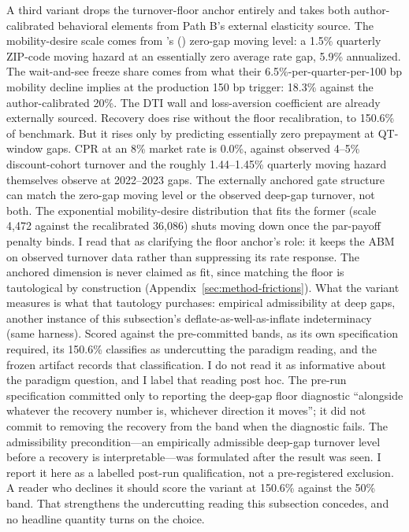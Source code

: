 \documentclass[12pt]{article}
\newcommand{\citepos}[1]{\citeauthor{#1}'s (\citeyear{#1})}
\begin{document}
A third variant drops the turnover-floor anchor entirely and takes both author-calibrated behavioral elements from Path B's external elasticity source. The mobility-desire scale comes from \citepos{liebersohn2024} zero-gap moving level: a 1.5\% quarterly ZIP-code moving hazard at an essentially zero average rate gap, 5.9\% annualized. The wait-and-see freeze share comes from what their 6.5\%-per-quarter-per-100 bp mobility decline implies at the production 150 bp trigger: 18.3\% against the author-calibrated 20\%. The DTI wall and loss-aversion coefficient are already externally sourced. Recovery does rise without the floor recalibration, to 150.6\% of benchmark. But it rises only by predicting essentially zero prepayment at QT-window gaps. CPR at an 8\% market rate is 0.0\%, against observed 4--5\% discount-cohort turnover and the roughly 1.44--1.45\% quarterly moving hazard \citet{liebersohn2024} themselves observe at 2022--2023 gaps. The externally anchored gate structure can match the zero-gap moving level or the observed deep-gap turnover, not both. The exponential mobility-desire distribution that fits the former (scale 4{,}472 against the recalibrated 36{,}086) shuts moving down once the par-payoff penalty binds. I read that as clarifying the floor anchor's role: it keeps the ABM on observed turnover data rather than suppressing its rate response. The anchored dimension is never claimed as fit, since matching the floor is tautological by construction (Appendix~\ref{sec:method-frictions}). What the variant measures is what that tautology purchases: empirical admissibility at deep gaps, another instance of this subsection's deflate-as-well-as-inflate indeterminacy (same harness). Scored against the pre-committed bands, as its own specification required, its 150.6\% classifies as undercutting the paradigm reading, and the frozen artifact records that classification. I do not read it as informative about the paradigm question, and I label that reading post hoc. The pre-run specification committed only to reporting the deep-gap floor diagnostic ``alongside whatever the recovery number is, whichever direction it moves''; it did not commit to removing the recovery from the band when the diagnostic fails. The admissibility precondition---an empirically admissible deep-gap turnover level before a recovery is interpretable---was formulated after the result was seen. I report it here as a labelled post-run qualification, not a pre-registered exclusion. A reader who declines it should score the variant at 150.6\% against the 50\% band. That strengthens the undercutting reading this subsection concedes, and no headline quantity turns on the choice.
\end{document}
